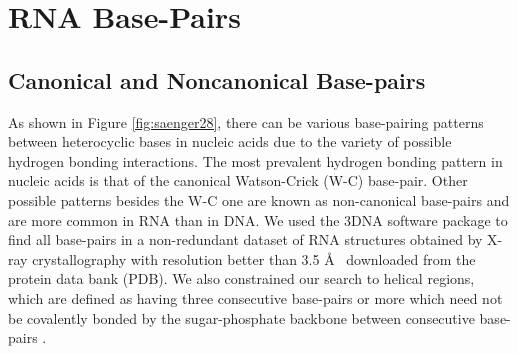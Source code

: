 \chapter{RNA Base-Pairs}
\label{basepairs} 

\section{Canonical and Noncanonical Base-pairs}
As  shown   in  Figure  \ref{fig:saenger28},  there   can  be  various
base-pairing patterns between heterocyclic  bases in nucleic acids due
to the  variety of possible  hydrogen bonding interactions.   The most
prevalent hydrogen  bonding pattern  in nucleic acids  is that  of the
canonical  Watson-Crick  (W-C)  base-pair.   Other  possible  patterns
besides the W-C one are known as non-canonical base-pairs and are more
common in  RNA than in DNA.   We used the  3DNA \cite{lu2003} software
package  to find  all base-pairs  in  a non-redundant  dataset of  RNA
structures  obtained by X-ray  crystallography with  resolution better
than 3.5  \AA~ downloaded from the  protein data bank  (PDB).  We also
constrained our search to helical regions, which are defined as having
three  consecutive base-pairs  or more  which need  not  be covalently
bonded by the  sugar-phosphate backbone between consecutive base-pairs
\cite{olson2009}.

